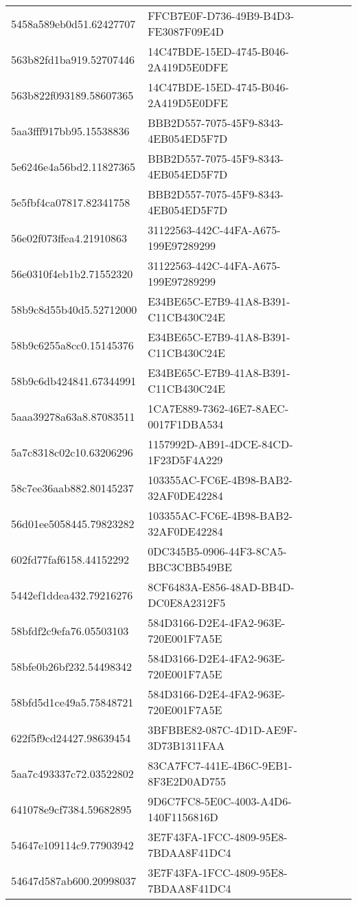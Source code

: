 \begin{tabular}{ll}
5458a589eb0d51.62427707 & FFCB7E0F-D736-49B9-B4D3-FE3087F09E4D \\
563b82fd1ba919.52707446 & 14C47BDE-15ED-4745-B046-2A419D5E0DFE \\
563b822f093189.58607365 & 14C47BDE-15ED-4745-B046-2A419D5E0DFE \\
5aa3fff917bb95.15538836 & BBB2D557-7075-45F9-8343-4EB054ED5F7D \\
5e6246e4a56bd2.11827365 & BBB2D557-7075-45F9-8343-4EB054ED5F7D \\
5e5fbf4ca07817.82341758 & BBB2D557-7075-45F9-8343-4EB054ED5F7D \\
56e02f073ffea4.21910863 & 31122563-442C-44FA-A675-199E97289299 \\
56e0310f4eb1b2.71552320 & 31122563-442C-44FA-A675-199E97289299 \\
58b9c8d55b40d5.52712000 & E34BE65C-E7B9-41A8-B391-C11CB430C24E \\
58b9c6255a8cc0.15145376 & E34BE65C-E7B9-41A8-B391-C11CB430C24E \\
58b9c6db424841.67344991 & E34BE65C-E7B9-41A8-B391-C11CB430C24E \\
5aaa39278a63a8.87083511 & 1CA7E889-7362-46E7-8AEC-0017F1DBA534 \\
5a7c8318c02c10.63206296 & 1157992D-AB91-4DCE-84CD-1F23D5F4A229 \\
58c7ee36aab882.80145237 & 103355AC-FC6E-4B98-BAB2-32AF0DE42284 \\
56d01ee5058445.79823282 & 103355AC-FC6E-4B98-BAB2-32AF0DE42284 \\
602fd77faf6158.44152292 & 0DC345B5-0906-44F3-8CA5-BBC3CBB549BE \\
5442ef1ddea432.79216276 & 8CF6483A-E856-48AD-BB4D-DC0E8A2312F5 \\
58bfdf2c9efa76.05503103 & 584D3166-D2E4-4FA2-963E-720E001F7A5E \\
58bfe0b26bf232.54498342 & 584D3166-D2E4-4FA2-963E-720E001F7A5E \\
58bfd5d1ce49a5.75848721 & 584D3166-D2E4-4FA2-963E-720E001F7A5E \\
622f5f9cd24427.98639454 & 3BFBBE82-087C-4D1D-AE9F-3D73B1311FAA \\
5aa7c493337c72.03522802 & 83CA7FC7-441E-4B6C-9EB1-8F3E2D0AD755 \\
641078e9cf7384.59682895 & 9D6C7FC8-5E0C-4003-A4D6-140F1156816D \\
54647e109114c9.77903942 & 3E7F43FA-1FCC-4809-95E8-7BDAA8F41DC4 \\
54647d587ab600.20998037 & 3E7F43FA-1FCC-4809-95E8-7BDAA8F41DC4 \\

\end{tabular}
